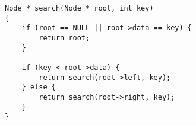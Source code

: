 \begin{lstlisting}[style=CStyle]
Node * search(Node * root, int key) 
{
    if (root == NULL || root->data == key) {
        return root;
    }

    if (key < root->data) {
        return search(root->left, key);
    } else {
        return search(root->right, key);
    }
}
\end{lstlisting}
                    